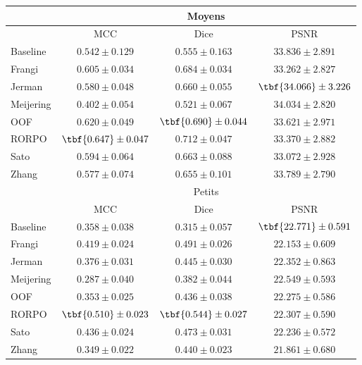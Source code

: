 \begin{table}[H]
\begin{center}
\begin{tabular}{lccc}
            \hline
            & \multicolumn{3}{c}{Moyens}                         \\
            \hline    
            & MCC & Dice & PSNR  \\
            Baseline	& $ 0.542 \pm 0.129 $ & $ 0.555 \pm 0.163 $ & $ 33.836 \pm	2.891 $ \\
            Frangi	  & $ 0.605 \pm 0.034 $ & $ 0.684 \pm 0.034 $ & $ 33.262 \pm	2.827 $ \\
            Jerman	  & $ 0.580 \pm 0.048 $ & $ 0.660 \pm 0.055 $ & $ \tbf{34.066} \pm	3.226 $ \\
            Meijering	& $ 0.402 \pm 0.054 $ & $ 0.521 \pm 0.067 $ & $ 34.034 \pm	2.820 $ \\
            OOF	      & $ 0.620 \pm 0.049 $ & $ \tbf{0.690} \pm 0.044 $ & $ 33.621 \pm	2.971 $ \\
            RORPO	    & $ \tbf{0.647} \pm 0.047 $ & $ 0.712 \pm 0.047 $ & $ 33.370 \pm	2.882 $ \\
            Sato	    & $ 0.594 \pm 0.064 $ & $ 0.663 \pm 0.088 $ & $ 33.072 \pm	2.928 $ \\
            Zhang	    & $ 0.577 \pm 0.074 $ & $ 0.655 \pm 0.101 $ & $ 33.789 \pm	2.790 $ \\
            \hline
            & \multicolumn{3}{c}{Petits}                          \\
            \hline
            & MCC & Dice & PSNR  \\
            Baseline	    & $ 0.358 \pm 0.038 $ & $ 0.315 \pm 0.057 $ & $ \tbf{22.771} \pm	0.591 $ \\
            Frangi	      & $ 0.419 \pm 0.024 $ & $ 0.491 \pm 0.026 $ & $ 22.153 \pm	0.609 $ \\
            Jerman  	    & $ 0.376 \pm 0.031 $ & $ 0.445 \pm 0.030 $ & $ 22.352 \pm	0.863 $ \\
            Meijering	    & $ 0.287 \pm 0.040 $ & $ 0.382 \pm 0.044 $ & $ 22.549 \pm	0.593 $ \\
            OOF	          & $ 0.353 \pm 0.025 $ & $ 0.436 \pm 0.038 $ & $ 22.275 \pm	0.586 $ \\
            RORPO	        & $ \tbf{0.510} \pm 0.023 $ & $ \tbf{0.544} \pm 0.027 $ & $ 22.307 \pm	0.590 $ \\
            Sato	        & $ 0.436 \pm 0.024 $ & $ 0.473 \pm 0.031 $ & $ 22.236 \pm	0.572 $ \\
            Zhang	        & $ 0.349 \pm 0.022 $ & $ 0.440 \pm 0.023 $ & $ 21.861 \pm	0.680 $ \\
  \hline
  \end{tabular}
  \end{center}
\end{table}

